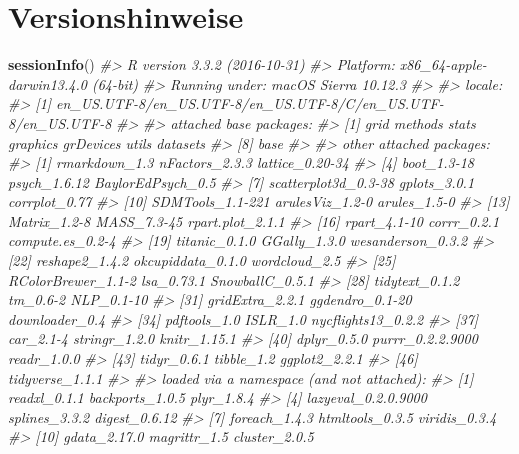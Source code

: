 \documentclass[12pt,]{book}
\newenvironment{Shaded}{\begin{snugshade}}{\end{snugshade}}
\newcommand{\KeywordTok}[1]{\textcolor[rgb]{0.13,0.29,0.53}{\textbf{{#1}}}}
\newcommand{\CommentTok}[1]{\textcolor[rgb]{0.56,0.35,0.01}{\textit{{#1}}}}
\newcommand{\NormalTok}[1]{{#1}}
\begin{document}
\section{Versionshinweise}\label{versionshinweise}

\begin{Shaded}
\begin{Highlighting}[]
\KeywordTok{sessionInfo}\NormalTok{() }
\CommentTok{#> R version 3.3.2 (2016-10-31)}
\CommentTok{#> Platform: x86_64-apple-darwin13.4.0 (64-bit)}
\CommentTok{#> Running under: macOS Sierra 10.12.3}
\CommentTok{#> }
\CommentTok{#> locale:}
\CommentTok{#> [1] en_US.UTF-8/en_US.UTF-8/en_US.UTF-8/C/en_US.UTF-8/en_US.UTF-8}
\CommentTok{#> }
\CommentTok{#> attached base packages:}
\CommentTok{#> [1] grid      methods   stats     graphics  grDevices utils     datasets }
\CommentTok{#> [8] base     }
\CommentTok{#> }
\CommentTok{#> other attached packages:}
\CommentTok{#>  [1] rmarkdown_1.3        nFactors_2.3.3       lattice_0.20-34     }
\CommentTok{#>  [4] boot_1.3-18          psych_1.6.12         BaylorEdPsych_0.5   }
\CommentTok{#>  [7] scatterplot3d_0.3-38 gplots_3.0.1         corrplot_0.77       }
\CommentTok{#> [10] SDMTools_1.1-221     arulesViz_1.2-0      arules_1.5-0        }
\CommentTok{#> [13] Matrix_1.2-8         MASS_7.3-45          rpart.plot_2.1.1    }
\CommentTok{#> [16] rpart_4.1-10         corrr_0.2.1          compute.es_0.2-4    }
\CommentTok{#> [19] titanic_0.1.0        GGally_1.3.0         wesanderson_0.3.2   }
\CommentTok{#> [22] reshape2_1.4.2       okcupiddata_0.1.0    wordcloud_2.5       }
\CommentTok{#> [25] RColorBrewer_1.1-2   lsa_0.73.1           SnowballC_0.5.1     }
\CommentTok{#> [28] tidytext_0.1.2       tm_0.6-2             NLP_0.1-10          }
\CommentTok{#> [31] gridExtra_2.2.1      ggdendro_0.1-20      downloader_0.4      }
\CommentTok{#> [34] pdftools_1.0         ISLR_1.0             nycflights13_0.2.2  }
\CommentTok{#> [37] car_2.1-4            stringr_1.2.0        knitr_1.15.1        }
\CommentTok{#> [40] dplyr_0.5.0          purrr_0.2.2.9000     readr_1.0.0         }
\CommentTok{#> [43] tidyr_0.6.1          tibble_1.2           ggplot2_2.2.1       }
\CommentTok{#> [46] tidyverse_1.1.1     }
\CommentTok{#> }
\CommentTok{#> loaded via a namespace (and not attached):}
\CommentTok{#>  [1] readxl_0.1.1        backports_1.0.5     plyr_1.8.4         }
\CommentTok{#>  [4] lazyeval_0.2.0.9000 splines_3.3.2       digest_0.6.12      }
\CommentTok{#>  [7] foreach_1.4.3       htmltools_0.3.5     viridis_0.3.4      }
\CommentTok{#> [10] gdata_2.17.0        magrittr_1.5        cluster_2.0.5      }

\end{Highlighting}
\end{Shaded}
\end{document}
